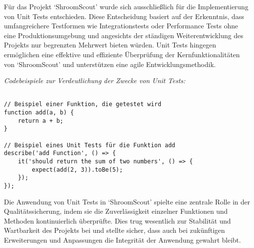 \documentclass[../main.tex]{subfiles} %
\begin{document}
Für das Projekt `ShroomScout' wurde sich ausschließlich für die Implementierung von Unit Tests entschieden. Diese Entscheidung basiert auf der Erkenntnis,
dass umfangreichere Testformen wie Integrationstests oder Performance Tests ohne eine Produktionsumgebung und angesichts der ständigen Weiterentwicklung des
Projekts nur begrenzten Mehrwert bieten würden. Unit Tests hingegen er\-mög\-lich\-en eine effektive und effiziente Überprüfung der Kernfunktionalitäten von
`ShroomScout' und unterstützen eine agile Entwicklungsmethodik.

\textit{Codebeispiele zur Verdeutlichung der Zwecke von Unit Tests:}

\begin{verbatim}

// Beispiel einer Funktion, die getestet wird
function add(a, b) {
    return a + b;
}

// Beispiel eines Unit Tests für die Funktion add
describe('add Function', () => {
    it('should return the sum of two numbers', () => {
        expect(add(2, 3)).toBe(5);
    });
});

\end{verbatim}

Die Anwendung von Unit Tests in `ShroomScout' spielte eine zentrale Rolle in der Qua\-li\-täts\-sich\-e\-rung, indem sie die Zuverlässigkeit einzelner
Funktionen und Methoden kontinuierlich überprüfte. Dies trug wesentlich zur Stabilität und Wartbarkeit des Projekts bei und stellte sicher, dass auch bei
zukünftigen Erweiterungen und Anpassungen die Integrität der Anwendung gewahrt bleibt.
\end{document}
